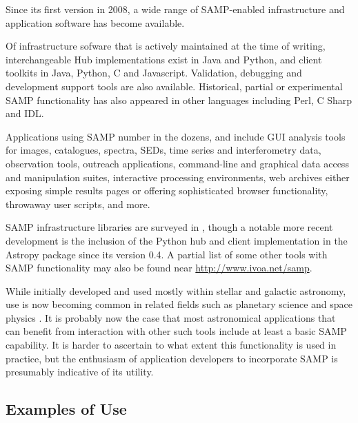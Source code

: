 \documentclass[5p]{elsarticle}
\begin{document}
Since its first version in 2008, a wide range of SAMP-enabled
infrastructure and application software has become available.

Of infrastructure sofware that is actively maintained at the time of writing,
interchangeable Hub implementations exist in Java and Python,
and client toolkits in Java, Python, C and Javascript.
Validation, debugging and development support tools are also available.
Historical, partial or experimental SAMP functionality has
also appeared in other languages including Perl, C Sharp and IDL.

Applications using SAMP number in the dozens, and include
GUI analysis tools for images, catalogues, spectra, SEDs,
time series and interferometry data,
observation tools,
outreach applications,
command-line and graphical data access and manipulation suites,
interactive processing environments,
web archives either exposing simple results pages
or offering sophisticated browser functionality,
throwaway user scripts,
and more.

SAMP infrastructure libraries are surveyed in \citet{adassxxii_bof},
though a notable more recent development is the inclusion of the Python
hub and client implementation in the Astropy package
\citep{2013A&A...558A..33A} since its version 0.4.
A partial list of some other tools with SAMP functionality
may also be found near \url{http://www.ivoa.net/samp}.

While initially developed and used mostly
within stellar and galactic astronomy,
use is now becoming common in related fields such as
planetary science \citep{ACVOplanetary}
and space physics \citep{ACVOspacephys}.
It is probably now the case that most astronomical applications
that can benefit from interaction with other such tools
include at least a basic SAMP capability.
It is harder to ascertain to what extent this functionality is used
in practice, but the enthusiasm of application developers to
incorporate SAMP is presumably indicative of its utility.

\subsection{Examples of Use} \label{sec:examples}
\end{document}
